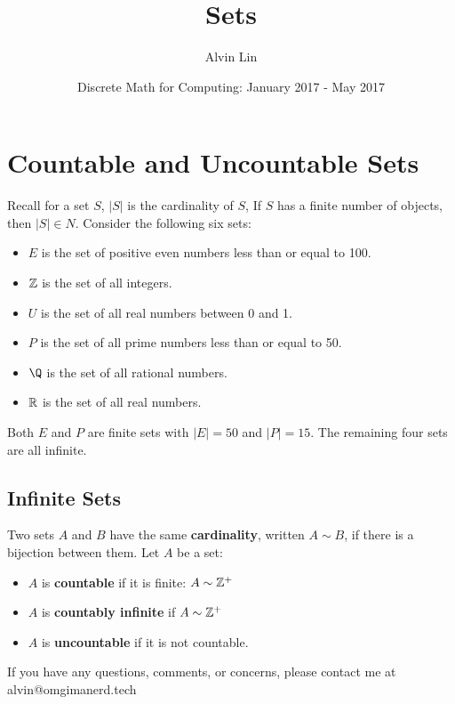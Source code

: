 \documentclass[letterpaper, 12pt]{math}
\title{Sets}
\author{Alvin Lin}
\date{Discrete Math for Computing: January 2017 - May 2017}
\begin{document}
\maketitle

\section*{Countable and Uncountable Sets}
Recall for a set \( S \), \( |S| \) is the cardinality of \( S \), If \( S \)
has a finite number of objects, then \( |S|\in N \). Consider the following
six sets:
\begin{itemize}
  \item \( E \) is the set of positive even numbers less than or equal
    to 100.
  \item \( \mathbb{Z} \) is the set of all integers.
  \item \( U \) is the set of all real numbers between 0 and 1.
  \item \( P \) is the set of all prime numbers less than or equal to
    50.
  \item \( \Q \) is the set of all rational numbers.
  \item \( \mathbb{R} \) is the set of all real numbers.
\end{itemize}
Both \( E \) and \( P \) are finite sets with \( |E| = 50 \) and \( |P| = 15 \).
The remaining four sets are all infinite.

\subsection*{Infinite Sets}
Two sets \( A \) and \( B \) have the same \textbf{cardinality}, written
\( A\sim B \), if there is a bijection between them.
Let \( A \) be a set:
\begin{itemize}
  \item \( A \) is \textbf{countable} if it is finite: \( A \sim \mathbb{Z}^{+} \)
  \item \( A \) is \textbf{countably infinite} if \( A \sim \mathbb{Z}^{+} \)
  \item \( A \) is \textbf{uncountable} if it is not countable.
\end{itemize}

\begin{center}
  If you have any questions, comments, or concerns, please contact me at
  alvin@omgimanerd.tech
\end{center}
\end{document}
